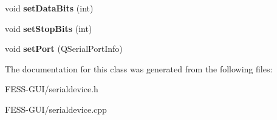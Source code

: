 \begin{DoxyCompactItemize}
\item 
\hypertarget{class_serial_device_ad0ddca3e77e1d1d4df7c68e83f1ecd91}{}\label{class_serial_device_ad0ddca3e77e1d1d4df7c68e83f1ecd91} 
void {\bfseries set\+Data\+Bits} (int)
\item 
\hypertarget{class_serial_device_a95b44d8167ae0a6a025ba9c4f2d5ee47}{}\label{class_serial_device_a95b44d8167ae0a6a025ba9c4f2d5ee47} 
void {\bfseries set\+Stop\+Bits} (int)
\item 
\hypertarget{class_serial_device_a1440b389cc1bba66e9854a32a5807a8f}{}\label{class_serial_device_a1440b389cc1bba66e9854a32a5807a8f} 
void {\bfseries set\+Port} (Q\+Serial\+Port\+Info)
\end{DoxyCompactItemize}


The documentation for this class was generated from the following files\+:\begin{DoxyCompactItemize}
\item 
F\+E\+S\+S-\/\+G\+U\+I/serialdevice.\+h\item 
F\+E\+S\+S-\/\+G\+U\+I/serialdevice.\+cpp\end{DoxyCompactItemize}
